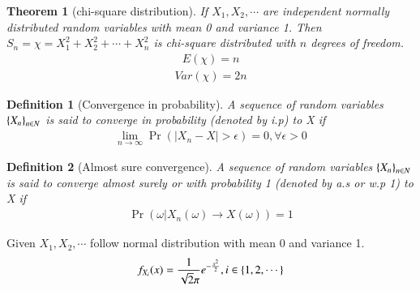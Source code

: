 \documentclass[journal,12pt,twocolumn]{IEEEtran}
\newtheorem{definition}{Definition}[section]
\newtheorem{theorem}{Theorem}[section]
\begin{document}
\begin{theorem}[chi-square distribution]
If $X_1,X_2,\cdots$ are independent normally distributed random variables with mean 0 and variance 1. Then $S_{n}=\chi=X_{1}^2+X_{2}^2+\cdots+X_{n}^2$ is chi-square distributed with $n$ degrees of freedom.
\begin{align}
    E(\chi)=n \label{eq:x2}
\end{align}
\begin{align}
    Var(\chi)=2n\label{eq:x10}
\end{align}\label{lem}
\end{theorem}

\begin{definition}[Convergence in probability]
A sequence of random variables $\left\{X_n\right\}_{n\in N}$ is said to converge in probability (denoted by i.p) to X if
\begin{align}
    \lim_{n \to \infty} \Pr(\left| X_{n}-X\right|>\epsilon)=0 ,\forall \epsilon>0
\end{align}\label{in prob}
\end{definition}

\begin{definition}[Almost sure convergence]
A sequence of random variables $\left\{X_n\right\}_{n\in N}$ is said to converge almost surely or with probability 1 (denoted by a.s or w.p 1) to X if \label{with prob 1}
\begin{align}
    \Pr(\omega |X_n(\omega) \to X(\omega))=1
\end{align}
\end{definition}





Given $X_1,X_2, \cdots$ follow normal distribution with mean 0 and variance 1.
\begin{align}
    f_{X_i}(x)=\frac{1}{\sqrt{2}\pi}e^{-\frac{x^2}{2}} ,i \in \left\{1,2,\cdots\right\}
\end{align}
\end{document}
